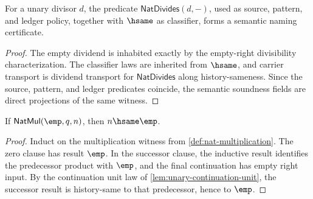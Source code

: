 \begin{theorem}
\label{thm:nat-divides-semantic-namecert}
For a unary divisor $d$, the predicate $\mathsf{NatDivides}(d,-)$, used as
source, pattern, and ledger policy, together with $\hsame$ as classifier,
forms a semantic naming certificate.
\end{theorem}
\begin{proof}
The empty dividend is inhabited exactly by the empty-right divisibility
characterization. The classifier laws are inherited from $\hsame$, and carrier
transport is dividend transport for $\mathsf{NatDivides}$ along
history-sameness. Since the source, pattern, and ledger predicates coincide,
the semantic soundness fields are direct projections of the same witness.
\end{proof}

\begin{lemma}
\label{lem:natmul-empty-left-empty-result}
If $\mathsf{NatMul}(\emp,q,n)$, then $n\hsame\emp$.
\end{lemma}
\begin{proof}
Induct on the multiplication witness from \autoref{def:nat-multiplication}. The zero clause has result $\emp$. In the successor clause, the inductive result identifies the predecessor product with $\emp$, and the final continuation has empty right input. By the continuation unit law of \autoref{lem:unary-continuation-unit}, the successor result is history-same to that predecessor, hence to $\emp$.
\end{proof}

